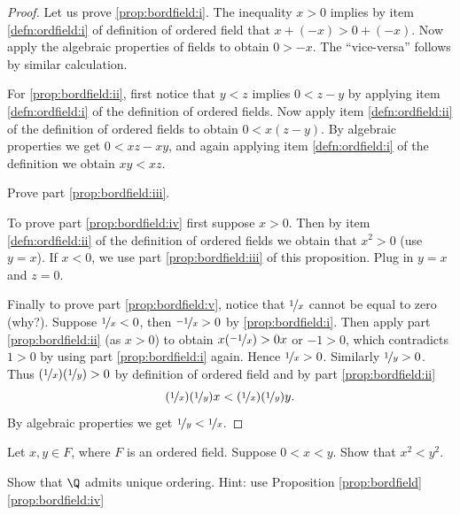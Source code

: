 \documentclass[12pt]{book}
\begin{document}
\begin{proof}
Let us prove \ref{prop:bordfield:i}.
The inequality $x > 0$ implies by item
\ref{defn:ordfield:i} of definition of ordered field that
$x + (-x) > 0 + (-x)$.
Now apply the algebraic properties of fields to
obtain $0 > -x$.
The ``vice-versa'' follows by similar calculation.

For \ref{prop:bordfield:ii}, first notice that $y < z$ implies
$0 < z - y$ by applying 
item \ref{defn:ordfield:i} of the definition of ordered fields.  
Now apply item 
\ref{defn:ordfield:ii} of the definition of ordered fields to obtain
$0 < x(z-y)$.
By algebraic properties we get $0 < xz - xy$,
and again applying item
\ref{defn:ordfield:i} of the definition we obtain $xy < xz$.

\begin{exercise}
Prove part \ref{prop:bordfield:iii}.
\end{exercise}

To prove part \ref{prop:bordfield:iv} first suppose $x > 0$.
Then
by item 
\ref{defn:ordfield:ii} of the definition of ordered fields we obtain
that $x^2 > 0$ (use $y=x$).
If $x < 0$, we use 
part \ref{prop:bordfield:iii} of this proposition.
Plug in $y=x$ and
$z=0$.

Finally to prove part \ref{prop:bordfield:v}, notice that
$\nicefrac{1}{x}$ cannot be equal to zero (why?).
Suppose $\nicefrac{1}{x} < 0$,
then $\nicefrac{-1}{x} > 0$ by \ref{prop:bordfield:i}.
Then apply
part \ref{prop:bordfield:ii} (as $x > 0$) to obtain
$x(\nicefrac{-1}{x}) > 0x$ or $-1 > 0$, which contradicts $1 > 0$ by using part
\ref{prop:bordfield:i} again.
Hence $\nicefrac{1}{x} > 0$.
Similarly $\nicefrac{1}{y} > 0$.
Thus $(\nicefrac{1}{x})(\nicefrac{1}{y}) > 0$
by definition of ordered field and by part \ref{prop:bordfield:ii}
\begin{equation*}
(\nicefrac{1}{x})(\nicefrac{1}{y})x < (\nicefrac{1}{x})(\nicefrac{1}{y})y .
\end{equation*}
By algebraic properties we get $\nicefrac{1}{y} < \nicefrac{1}{x}$.
\end{proof}

\begin{exercise}
Let $x, y \in F$, where $F$ is an ordered field.
Suppose 
$0 < x < y$.
Show that $x^2 < y^2$.
\end{exercise}

\begin{exercise} Show that $\Q$ admits unique ordering. 
Hint: use Proposition \ref{prop:bordfield}\ref{prop:bordfield:iv}
\end{exercise}
\end{document}

